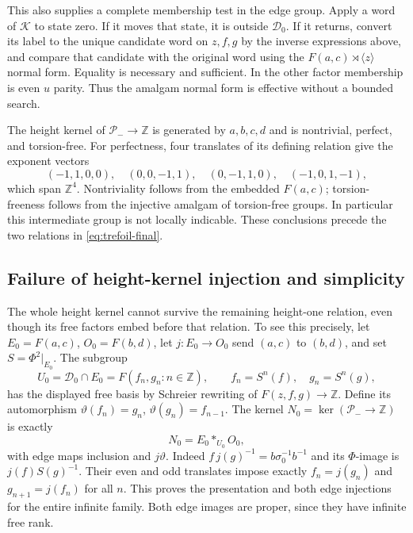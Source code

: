 \documentclass[11pt]{amsart}
\theoremstyle{definition}
\theoremstyle{remark}
\newcommand{\Z}{\mathbb Z}
\begin{document}
This also supplies a complete membership test in the edge group.
Apply a word of $\mathcal K$ to state zero. If it moves that state,
it is outside $\mathcal D_0$. If it returns, convert its label to the
unique candidate word on $z,f,g$ by the inverse expressions above,
and compare that candidate with the original word using the
$F(a,c)\rtimes\langle z\rangle$ normal form. Equality is necessary
and sufficient. In the other factor membership is even $u$ parity.
Thus the amalgam normal form is effective without a bounded search.

The height kernel of $\mathcal P_-\to\Z$ is generated by $a,b,c,d$
and is nontrivial, perfect, and torsion-free. For perfectness, four
translates of its defining relation give the exponent vectors
\[
 (-1,1,0,0),\quad(0,0,-1,1),\quad(0,-1,1,0),\quad(-1,0,1,-1),
\]
which span $\Z^4$. Nontriviality follows from the embedded $F(a,c)$;
torsion-freeness follows from the injective amalgam of torsion-free
groups. In particular this intermediate group is not locally indicable.
These conclusions precede the two relations in \eqref{eq:trefoil-final}.

\subsection{Failure of height-kernel injection and simplicity}
The whole height kernel cannot survive the remaining height-one
relation, even though its free factors embed before that relation.
To see this precisely, let $E_0=F(a,c)$, $O_0=F(b,d)$, let
$j:E_0\to O_0$ send $(a,c)$ to $(b,d)$, and set
$S=\Phi^2|_{E_0}$. The subgroup
\[
 U_0=\mathcal D_0\cap E_0
    =F(f_n,g_n:n\in\Z),\qquad f_n=S^n(f),\quad g_n=S^n(g),
\]
has the displayed free basis by Schreier rewriting of
$F(z,f,g)\to\Z$. Define its automorphism
$\vartheta(f_n)=g_n$, $\vartheta(g_n)=f_{n-1}$.
The kernel $N_0=\ker(\mathcal P_-\to\Z)$ is exactly
\begin{equation}\label{eq:height-amalgam}
                      N_0=E_0*_{U_0}O_0,
\end{equation}
with edge maps inclusion and $j\vartheta$. Indeed
$f\,j(g)^{-1}=b\sigma_0^{-1}b^{-1}$ and its $\Phi$-image is
$j(f)S(g)^{-1}$. Their even and odd translates impose exactly
$f_n=j(g_n)$ and $g_{n+1}=j(f_n)$ for all $n$. This proves the
presentation and both edge injections for the entire infinite family.
Both edge images are proper, since they have infinite free rank.
\end{document}

